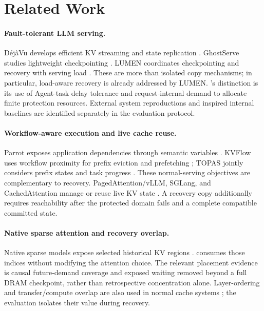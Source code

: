 \section{Related Work}\label{sec:related}

\paragraph{Fault-tolerant LLM serving.}
D\'ej\`aVu develops efficient KV streaming and state replication
\cite{strati2024dejavu}. GhostServe studies lightweight checkpointing
\cite{jayakody2026ghostserve}. LUMEN coordinates checkpointing and recovery
with serving load \cite{cao2026lumen}. These are more than isolated copy
mechanisms; in particular, load-aware recovery is already addressed by
LUMEN. \system's distinction is its use of Agent-task delay tolerance and
request-internal demand to allocate finite protection resources. External
system reproductions and inspired internal baselines are identified
separately in the evaluation protocol.

\paragraph{Workflow-aware execution and live cache reuse.}
Parrot exposes application dependencies through semantic variables
\cite{lin2024parrot}. KVFlow uses workflow proximity for prefix eviction
and prefetching \cite{pan2025kvflow}; TOPAS jointly considers prefix states
and task progress \cite{ni2026topas}. These normal-serving objectives are
complementary to recovery. PagedAttention/vLLM, SGLang, and CachedAttention
manage or reuse live KV state
\cite{kwon2023vllm,zheng2024sglang,gao2024cachedattention}. A recovery copy
additionally requires reachability after the protected domain fails and a
complete compatible committed state.

\paragraph{Native sparse attention and recovery overlap.}
Native sparse models expose selected historical KV regions
\cite{huang2026nosav2,fasa2026minicpm4nsa,openbmb2025minicpm41}.
\system consumes those indices without modifying the attention choice.
The relevant placement evidence is causal future-demand coverage and
exposed waiting removed beyond a full DRAM checkpoint, rather than
retrospective concentration alone. Layer-ordering and transfer/compute
overlap are also used in normal cache systems
\cite{gao2024cachedattention,pan2025kvflow}; the evaluation isolates their
value during recovery.

